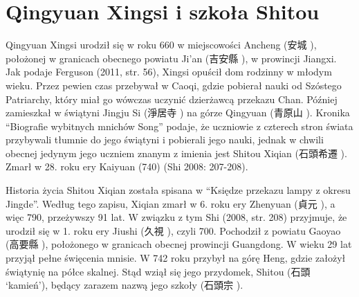 \section{Qingyuan Xingsi i szkoła Shitou}
Qingyuan Xingsi urodził się w roku 660 w miejscowości Ancheng (安城 ), położonej w granicach obecnego powiatu Ji'an (吉安縣 ), w prowincji Jiangxi.
Jak podaje Ferguson (2011, str. 56), Xingsi opuścił dom rodzinny w młodym wieku.
Przez pewien czas przebywał w Caoqi, gdzie pobierał nauki od Szóstego Patriarchy, który miał go wówczas uczynić dzierżawcą przekazu Chan.
Później zamieszkał w świątyni Jingju Si (淨居寺 ) na górze Qingyuan (青原山 ).
Kronika ``Biografie wybitnych mnichów Song'' podaje, że uczniowie z czterech stron świata przybywali tłumnie do jego świątyni i pobierali jego nauki, jednak w chwili obecnej jedynym jego uczniem znanym z imienia jest Shitou Xiqian (石頭希遷 ).
Zmarł w 28. roku ery Kaiyuan (740)
(Shi 2008: 207-208).

Historia życia Shitou Xiqian została spisana w ``Księdze przekazu lampy z okresu Jingde''.
Według tego zapisu, Xiqian zmarł w 6. roku ery Zhenyuan (貞元 ), a więc 790, przeżywszy 91 lat.
W związku z tym Shi (2008, str. 208) przyjmuje, że urodził się w 1. roku ery Jiushi (久視 ), czyli 700.
Pochodził z powiatu Gaoyao (高要縣 ), położonego w granicach obecnej prowincji Guangdong.
W wieku 29 lat przyjął pełne święcenia mnisie.
W 742 roku przybył na górę Heng, gdzie założył świątynię na półce skalnej.
Stąd wziął się jego przydomek, Shitou (石頭  `kamień'), będący zarazem nazwą jego szkoły (石頭宗 ).

